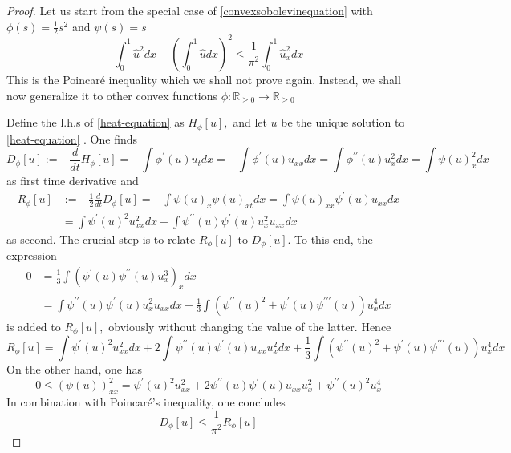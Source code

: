 \begin{proof}
	Let us start from the special case of \eqref{convexsobolevinequation} with $\phi(s)=\frac{1}{2} s^{2}$ and $\psi(s)=s$
	$$
	\int_{0}^{1} \hat{u}^{2} d x-\left(\int_{0}^{1} \hat{u} d x\right)^{2} \leq \frac{1}{\pi^{2}} \int_{0}^{1} \hat{u}_{x}^{2} d x
	$$
	This is the Poincaré inequality which we shall not prove again. Instead, we shall now generalize it to other convex functions $\phi: \mathbb{R}_{\geq 0} \rightarrow \mathbb{R}_{\geq 0}$
	
	Define the l.h.s of \eqref{heat-equation} as $H_{\phi}[u],$ and let $u$ be the unique solution to \eqref{heat-equation} . One finds
	$$
	D_{\phi}[u]:=-\frac{d}{d t} H_{\phi}[u]=-\int \phi^{\prime}(u) u_{t} d x=-\int \phi^{\prime}(u) u_{x x} d x=\int \phi^{\prime \prime}(u) u_{x}^{2} d x=\int \psi(u)_{x}^{2} d x
	$$
	as first time derivative and
	$$
	\begin{aligned}
		R_{\phi}[u] &:=-\frac{1}{2} \frac{d}{d t} D_{\phi}[u]=-\int \psi(u)_{x} \psi(u)_{x t} d x=\int \psi(u)_{x x} \psi^{\prime}(u) u_{x x} d x \\
		&=\int \psi^{\prime}(u)^{2} u_{x x}^{2} d x+\int \psi^{\prime \prime}(u) \psi^{\prime}(u) u_{x}^{2} u_{x x} d x
	\end{aligned}
	$$
	as second. The crucial step is to relate $R_{\phi}[u]$ to $D_{\phi}[u] .$ To this end, the expression
	$$
	\begin{aligned}
		0 &=\frac{1}{3} \int\left(\psi^{\prime}(u) \psi^{\prime \prime}(u) u_{x}^{3}\right)_{x} d x \\
		&=\int \psi^{\prime \prime}(u) \psi^{\prime}(u) u_{x}^{2} u_{x x} d x+\frac{1}{3} \int\left(\psi^{\prime \prime}(u)^{2}+\psi^{\prime}(u) \psi^{\prime \prime \prime}(u)\right) u_{x}^{4} d x
	\end{aligned}
	$$
	is added to $R_{\phi}[u],$ obviously without changing the value of the latter. Hence
	$$
	R_{\phi}[u]=\int \psi^{\prime}(u)^{2} u_{x x}^{2} d x+2 \int \psi^{\prime \prime}(u) \psi^{\prime}(u) u_{x x} u_{x}^{2} d x+\frac{1}{3} \int\left(\psi^{\prime \prime}(u)^{2}+\psi^{\prime}(u) \psi^{\prime \prime \prime}(u)\right) u_{x}^{4} d x
	$$
	On the other hand, one has
	$$
	0 \leq(\psi(u))_{x x}^{2}=\psi^{\prime}(u)^{2} u_{x x}^{2}+2 \psi^{\prime \prime}(u) \psi^{\prime}(u) u_{x x} u_{x}^{2}+\psi^{\prime \prime}(u)^{2} u_{x}^{4}
	$$
	In combination with Poincaré's inequality, one concludes
	\begin{equation}\label{entropy-production-prime-entropy-production-inequation}
	D_{\phi}[u] \leq \frac{1}{\pi^{2}} R_{\phi}[u]

\end{equation}
\end{proof}
